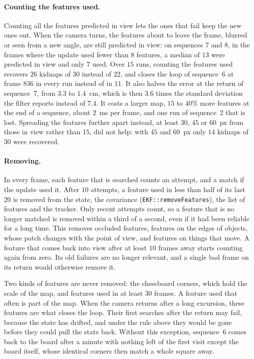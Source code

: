 \documentclass[11pt]{article}
\begin{document}
\paragraph{Counting the features used.}
Counting all the features predicted in view lets the ones that fail keep the new ones out. When the
camera turns, the features about to leave the frame, blurred or seen from a new angle, are still
predicted in view: on sequences 7 and 8, in the frames where the update used fewer than $8$
features, a median of $13$ were predicted in view and only $7$ used. Over $15$ runs, counting the
features used recovers $26$ kidnaps of $30$ instead of $22$, and closes the loop of sequence~6 at
frame $836$ in every run instead of in $11$. It also halves the error at the return of sequence~7,
from $3.3$ to $1.4$~cm, which is then $3.6$ times the standard deviation the filter reports instead
of $7.4$. It
costs a larger map, $15$ to $40\%$ more features at the end of a sequence, about $2$~ms per frame,
and one run of sequence~2 that is lost. Spreading the features further apart instead, at least
$30$, $45$ or $60$~px from those in view rather than $15$, did not help: with $45$ and $60$~px only
$14$ kidnaps of $30$ were recovered.

\paragraph{Removing.}
In every frame, each feature that is searched counts an attempt, and a match if the update used
it. After $10$ attempts, a feature used in less than half of its last $20$ is removed from the
state, the covariance (\texttt{EKF::removeFeatures}), the list of features and the tracker. Only
recent attempts count, so a feature that is no longer matched is removed within a third of a
second, even if it had been reliable for a long time. This removes occluded features, features on the edges of objects,
whose patch changes with the point of view, and features on things that move. A feature that comes
back into view after at least $10$ frames away starts counting again from zero. Its old failures
are no longer relevant, and a single bad frame on its return would otherwise remove it.

Two kinds of features are never removed: the chessboard corners, which hold the scale of the map,
and features used in at least $30$ frames. A feature used that often is part of the map. When
the camera returns after a long excursion, these features are what closes the loop. Their
first searches after the return may fail, because the state has drifted, and under the rule above
they would be gone before they could pull the state back. Without this exception, sequence~6 comes
back to the board after a minute with nothing left of the first visit except the board itself,
whose identical corners then match a whole square away.
\end{document}
